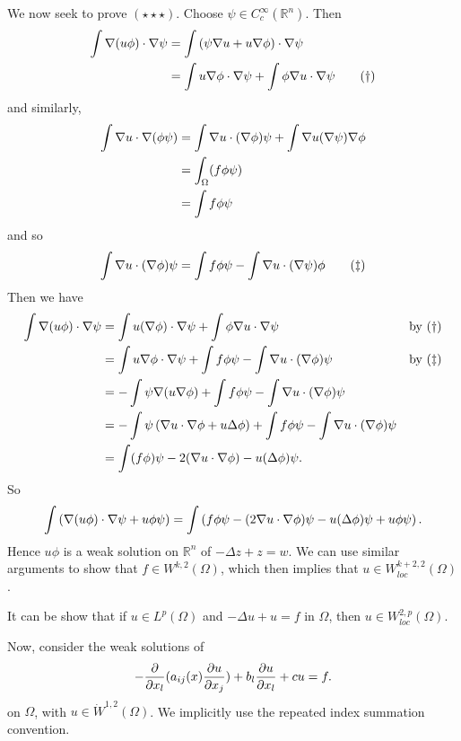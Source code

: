 \documentclass[10pt, oneside, reqno]{amsart}
\theoremstyle{plain}%
\numberwithin{equation}{section}
\theoremstyle{definition}
\theoremstyle{remark}
\newcommand{\R}{\mathbb{R}}
\begin{document}
We now seek to prove $(\star \star \star)$.  Choose $\psi \in C^\infty_c(\R^n)$.  Then \begin{align*}
	\int \nabla(u \phi) \cdot \nabla \psi &= \int \left( \psi \nabla u  + u \nabla \phi \right) \cdot \nabla \psi \\
	&= \int u \nabla \phi \cdot \nabla \psi + \int \phi \nabla u \cdot \nabla \psi \tag{$\dagger$} 
\end{align*} and similarly,
\begin{align*}
\int \nabla u \cdot \nabla(\phi \psi)  &= \int \nabla u \cdot (\nabla \phi) \psi + \int \nabla u (\nabla \psi) \nabla \phi \\
&= \int_\Omega(f \phi \psi)  \\
&= \int f \phi \psi
\end{align*} and so \[
	\int \nabla u \cdot (\nabla \phi) \psi = \int f \phi \psi - \int \nabla u \cdot (\nabla \psi ) \phi \tag{$\ddag$}
\]  Then we have \begin{align*}
	\int \nabla(u \phi) \cdot \nabla \psi &= \int u (\nabla \phi) \cdot \nabla \psi + \int \phi \nabla u \cdot \nabla \psi &\text{by $(\dagger)$} \\
	&=  \int u \nabla \phi \cdot \nabla \psi + \int f \phi \psi - \int \nabla u \cdot (\nabla \phi) \psi &\text{by $(\ddag)$} \\
	&= - \int \psi \nabla(u \nabla \phi) + \int f \phi \psi - \int \nabla u \cdot (\nabla \phi) \psi \\
	&= - \int \psi \left( \nabla u \cdot \nabla \phi + u \Delta \phi \right) + \int f \phi \psi - \int \nabla u \cdot (\nabla \phi) \psi \\
	&= \int (f \phi) \psi - 2 (\nabla u \cdot \nabla \phi) - u (\Delta \phi) \psi.
\end{align*}  So \[
	\int \left( \nabla(u \phi) \cdot \nabla \psi + u \phi \psi \right) = \int \left(f \phi \psi - (2 \nabla u \cdot \nabla \phi) \psi - u (\Delta \phi) \psi + u \phi \psi\right).
\]
Hence $u \phi$ is a weak solution on $\R^n$ of $-\Delta z + z = w$.  We can use similar arguments to show that $f \in W^{k, 2}(\Omega)$, which then implies that $u \in W^{k+2, 2}_{loc}(\Omega)$.  

It can be show that if $u \in L^p(\Omega)$ and $-\Delta u + u = f$ in $\Omega$, then $u \in W^{2, p}_{loc}(\Omega)$.


Now, consider the weak solutions of \begin{equation}
	-\frac{\partial }{\partial x_l} (a_{ij}(x) \frac{\partial u}{\partial x_j}) + b_l \frac{\partial u}{\partial x_l} + cu = f.
\end{equation} on $\Omega$, with $u \in \dot W^{1, 2}(\Omega)$.   We implicitly use the repeated index summation convention.
\end{document}

